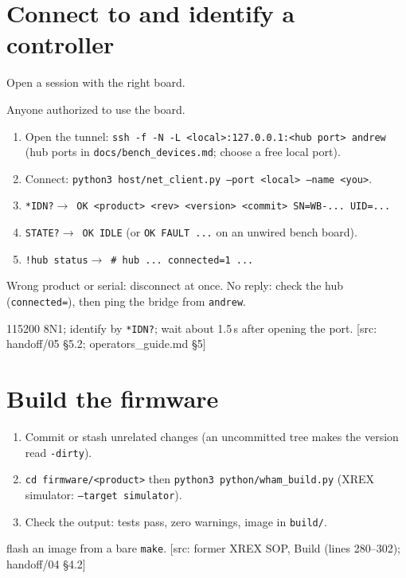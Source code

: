 \documentclass[11pt]{article}
\newcommand{\code}[1]{\texttt{#1}}
\newcommand{\file}[1]{\nolinkurl{#1}}
\newcommand{\src}[1]{{\scriptsize\textcolor[gray]{0.45}{[src: #1]}}}
\newcommand{\cl}[2]{\texttt{#1}\hfill$\to$~\texttt{#2}}
\newenvironment{procedure}{\begin{description}[style=nextline, leftmargin=1.2em, font=\normalfont\bfseries]}{\end{description}}
\newcommand{\pitem}[1]{\item[#1]}
\begin{document}
\section{Connect to and identify a controller}
\label{sec:connect}
\begin{procedure}
  \pitem{Purpose} Open a session with the right board.
  \pitem{Who} Anyone authorized to use the board.
  \pitem{Steps}
    \begin{enumerate}
      \item Open the tunnel: \code{ssh -f -N -L <local>:127.0.0.1:<hub port> andrew} (hub ports in \file{docs/bench_devices.md}; choose a free local port).
      \item Connect: \code{python3 host/net\_client.py --port <local> --name <you>}.
      \item \cl{*IDN?}{OK <product> <rev> <version> <commit> SN=WB-... UID=...}
      \item \cl{STATE?}{OK IDLE} (or \code{OK FAULT ...} on an unwired bench board).
      \item \cl{!hub status}{\# hub ... connected=1 ...}
    \end{enumerate}
  \pitem{If the reply differs} Wrong product or serial: disconnect at once. No reply: check the hub (\code{connected=}),
    then ping the bridge from \code{andrew}.
  \pitem{Direct USB-serial} 115200 8N1; identify by \code{*IDN?}; wait about 1.5\,s after opening the port.
  \src{handoff/05 \S5.2; operators\_guide.md \S5}
\end{procedure}

\section{Build the firmware}
\label{sec:build}
\begin{procedure}
  \pitem{Steps}
    \begin{enumerate}
      \item Commit or stash unrelated changes (an uncommitted tree makes the version read \code{-dirty}).
      \item \code{cd firmware/<product>} then \code{python3 python/wham\_build.py} (XREX simulator: \code{--target simulator}).
      \item Check the output: tests pass, zero warnings, image in \file{build/}.
    \end{enumerate}
  \pitem{Never} flash an image from a bare \code{make}.
  \src{former XREX SOP, Build (lines 280--302); handoff/04 \S4.2}
\end{procedure}
\end{document}
